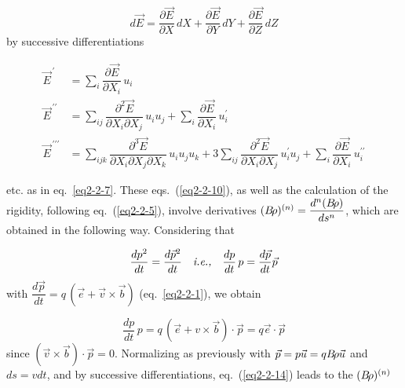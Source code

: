  \begin{equation}
	 d\vec  E = \dfrac{\partial\vec  E}{\partial X}\, dX + 
	 \dfrac{\partial\vec  E }{\partial Y} \, dY + 
	 \dfrac{\partial\vec  E }{ \partial Z} \, dZ
 	\label{eq2-2-11}
 \end{equation} 
%
 by successive differentiations

\begin{equation}
	\begin{aligned}
		\vec  E^{\,\prime} 
		     & =   \sum_ i \dfrac{\partial\vec  E}{\partial X_i} \,u_i \\
		\vec  E^{\,\prime\prime} 
		     & =  \sum_{ij} \dfrac{\partial^ 2\vec  E}{\partial X_i\partial X_j}\, u_i u_j 
		       +\sum_i \dfrac{\partial\vec  E}{\partial X_i} \,u^{\prime}_i \\
		\vec  E^{\,\prime\prime\prime} 
		     & =  \sum_{ijk} \dfrac{\partial^ 3\vec  E }{\partial X_i\partial X_j\partial X_k}\,
		        u_i u_j u_k 
		        + 3 \sum_{ij} \dfrac{\partial^ 2\vec  E}{\partial X_i\partial X_j} \,u^{\prime}_i u_j 
		        + \sum_i \dfrac{\partial\vec  E}{\partial X_i} \,u^{\prime\prime}_i 
	\end{aligned}
	\label{eq2-2-12}
\end{equation}

\noindent etc. as in eq.~\ref{eq2-2-7}. 
These eqs.~(\ref{eq2-2-10}), as well as the calculation of the rigidity, following 
eq.~(\ref{eq2-2-5}), involve 
derivatives $ (B\!\rho)^{(n)} =  \dfrac{ d^n(B\!\rho )}{ds^n} $, which are obtained in the following way. 
Considering that 

\begin{equation}
	\dfrac{dp^2 }{dt} = \dfrac{d\vec  p^{2} }{ dt}
	\quad \text{\emph{i.e.,}} \quad 
	\dfrac{dp}{dt}\, p = \dfrac{d\vec  p}{dt} \vec  p
	\label{eq2-2-13}
\end{equation}
%
with $ \dfrac{ d\vec  p }{ dt} = q\,(\vec  e +\vec v\times\vec  b) $ 
(eq.~\ref{eq2-2-1}), we obtain

\begin{equation}
	\dfrac{dp }{ dt} \,p =  q\,(\vec  e + v\times\vec  b)\cdot \vec  p =q\vec  e \cdot \vec  p
	\label{eq2-2-14}
\end{equation}
%
since $ (\vec  v\times\vec  b) \cdot \vec  p=0$.  Normalizing as
previously with $ \vec  p=p\vec  u=qB\!\rho\vec  u $ and $ ds=vdt$,  and 
by successive differentiations, eq.~(\ref{eq2-2-14}) leads to the $ (B\!\rho )^{(n)} $

